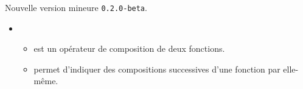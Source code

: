 Nouvelle version mineure \verb+0.2.0-beta+.

\begin{itemize}[itemsep=.5em]
    \item {}
    \begin{itemize}[itemsep=.5em]
        \item {} est un opérateur de composition de deux fonctions.

        \item {} permet d'indiquer des compositions successives d'une fonction par elle-même.
    \end{itemize}





    \separation
\end{itemize}

